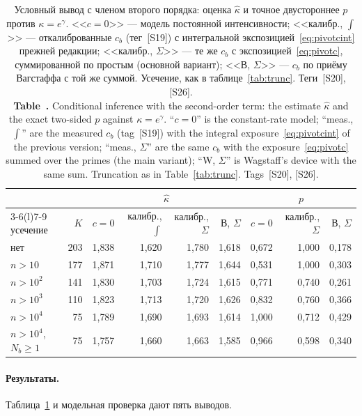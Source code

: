 \documentclass[11pt,a4paper]{article}
\newcommand{\encaptab}[1]{\\[3pt]\foreignlanguage{english}{%
  \textbf{Table~\thetable.} #1}}
\theoremstyle{plain}
\theoremstyle{remark}
\newcommand{\eg}{e^{\gamma}}
\begin{document}
\begin{table}[t]
\centering
\caption{Условный вывод с членом второго порядка: оценка $\hat\kappa$ и точное
двустороннее $p$ против $\kappa=\eg$. <<$c{=}0$>> --- модель постоянной
интенсивности; <<калибр., $\int$>> --- откалиброванные $c_b$ (тег~[S19]) с
интегральной экспозицией~\eqref{eq:pivotcint} прежней редакции; <<калибр.,
$\Sigma$>> --- те же $c_b$ с экспозицией~\eqref{eq:pivotc}, суммированной по
простым (основной вариант); <<В, $\Sigma$>> --- $c_b$ по приёму Вагстаффа с той же
суммой. Усечение, как в таблице~\ref{tab:trunc}. Теги~[S20], [S26].
\encaptab{Conditional inference with the second-order term: the estimate
$\hat\kappa$ and the exact two-sided $p$ against $\kappa=\eg$. ``$c{=}0$'' is the
constant-rate model; ``meas., $\int$'' are the measured $c_b$ (tag~[S19]) with the
integral exposure~\eqref{eq:pivotcint} of the previous version; ``meas., $\Sigma$''
are the same $c_b$ with the exposure~\eqref{eq:pivotc} summed over the primes (the
main variant); ``W, $\Sigma$'' is Wagstaff's device with the same sum. Truncation
as in Table~\ref{tab:trunc}. Tags~[S20], [S26].}}
\label{tab:second}
\small
\setlength{\tabcolsep}{4pt}
\begin{tabular}{lrrrrrrrr}
\toprule
& & \multicolumn{4}{c}{$\hat\kappa$} & \multicolumn{3}{c}{$p$}\\
\cmidrule(lr){3-6}\cmidrule(l){7-9}
усечение & $K$ & $c{=}0$ & калибр., $\int$ & калибр., $\Sigma$ & В, $\Sigma$
& $c{=}0$ & калибр., $\Sigma$ & В, $\Sigma$\\
\midrule
нет & 203 & 1{,}838 & 1{,}620 & 1{,}780 & 1{,}618 & 0{,}672 & 1{,}000 & 0{,}178\\
$n>10$ & 177 & 1{,}871 & 1{,}710 & 1{,}777 & 1{,}644 & 0{,}531 & 1{,}000 & 0{,}303\\
$n>10^2$ & 141 & 1{,}830 & 1{,}703 & 1{,}724 & 1{,}615 & 0{,}771 & 0{,}740 & 0{,}261\\
$n>10^3$ & 110 & 1{,}823 & 1{,}713 & 1{,}720 & 1{,}626 & 0{,}832 & 0{,}760 & 0{,}366\\
$n>10^4$ & 75 & 1{,}789 & 1{,}690 & 1{,}693 & 1{,}614 & 1{,}000 & 0{,}712 & 0{,}429\\
\midrule
$n>10^4$, $N_b\ge1$ & 75 & 1{,}757 & 1{,}660 & 1{,}663 & 1{,}585 & 0{,}966 & 0{,}598 & 0{,}340\\
\bottomrule
\end{tabular}
\end{table}

\paragraph{Результаты.} Таблица~\ref{tab:second} и модельная проверка дают пять
выводов.
\end{document}

